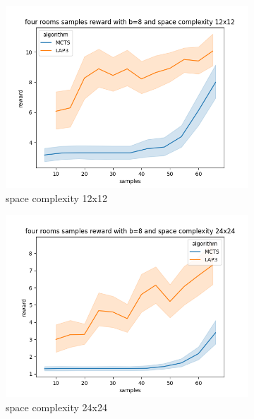 \documentclass[bibliography=totoc]{scrartcl}
\begin{document}
\begin{figure}[h!]
	\centering
	\begin{subfigure}[b]{0.3\linewidth}
		\includegraphics[width=\linewidth]{img/four_rooms_samples__reward_b_8_LAP3_MCTS_12.png}
        \caption{space complexity 12x12}	
    \end{subfigure}
	\hspace{0.02\textwidth}
	\begin{subfigure}[b]{0.3\linewidth}
		\includegraphics[width=\linewidth]{img/four_rooms_samples__reward_b_8_LAP3_MCTS_24.png}
		\caption{space complexity 24x24}
	\end{subfigure}
	\hspace{0.02\textwidth}
	\begin{subfigure}[b]{0.3\linewidth}

\end{subfigure}
\end{figure}
\end{document}
